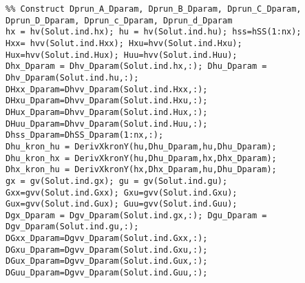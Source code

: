 \documentclass{article}
\begin{document}
\begin{verbatim}
%% Construct Dprun_A_Dparam, Dprun_B_Dparam, Dprun_C_Dparam, Dprun_D_Dparam, Dprun_c_Dparam, Dprun_d_Dparam
hx = hv(Solut.ind.hx); hu = hv(Solut.ind.hu); hss=hSS(1:nx);
Hxx= hvv(Solut.ind.Hxx); Hxu=hvv(Solut.ind.Hxu); Hux=hvv(Solut.ind.Hux); Huu=hvv(Solut.ind.Huu);
Dhx_Dparam = Dhv_Dparam(Solut.ind.hx,:); Dhu_Dparam = Dhv_Dparam(Solut.ind.hu,:);
DHxx_Dparam=Dhvv_Dparam(Solut.ind.Hxx,:);
DHxu_Dparam=Dhvv_Dparam(Solut.ind.Hxu,:);
DHux_Dparam=Dhvv_Dparam(Solut.ind.Hux,:);
DHuu_Dparam=Dhvv_Dparam(Solut.ind.Huu,:);
Dhss_Dparam=DhSS_Dparam(1:nx,:);
Dhu_kron_hu = DerivXkronY(hu,Dhu_Dparam,hu,Dhu_Dparam);
Dhu_kron_hx = DerivXkronY(hu,Dhu_Dparam,hx,Dhx_Dparam);
Dhx_kron_hu = DerivXkronY(hx,Dhx_Dparam,hu,Dhu_Dparam);
gx = gv(Solut.ind.gx); gu = gv(Solut.ind.gu);
Gxx=gvv(Solut.ind.Gxx); Gxu=gvv(Solut.ind.Gxu); Gux=gvv(Solut.ind.Gux); Guu=gvv(Solut.ind.Guu);
Dgx_Dparam = Dgv_Dparam(Solut.ind.gx,:); Dgu_Dparam = Dgv_Dparam(Solut.ind.gu,:);
DGxx_Dparam=Dgvv_Dparam(Solut.ind.Gxx,:);
DGxu_Dparam=Dgvv_Dparam(Solut.ind.Gxu,:);
DGux_Dparam=Dgvv_Dparam(Solut.ind.Gux,:);
DGuu_Dparam=Dgvv_Dparam(Solut.ind.Guu,:);


\end{verbatim}
\end{document}
